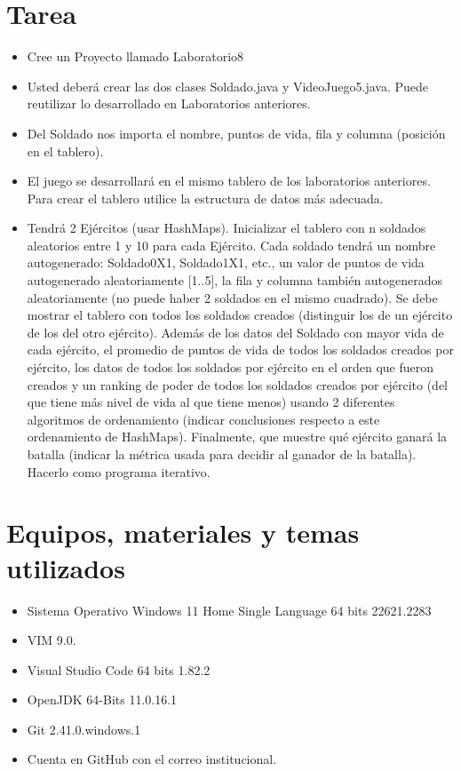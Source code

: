 \documentclass{article}
\begin{document}
	\section{Tarea}
	\begin{itemize}
		\subsection{Videojuego}
			\item Cree un Proyecto llamado Laboratorio8
			\item Usted deberá crear las dos clases Soldado.java y VideoJuego5.java. Puede reutilizar lo
desarrollado en Laboratorios anteriores.
			\item Del Soldado nos importa el nombre, puntos de vida, fila y columna (posición en el tablero).
			\item El juego se desarrollará en el mismo tablero de los laboratorios anteriores. Para crear el
tablero utilice la estructura de datos más adecuada.
			\item Tendrá 2 Ejércitos (usar HashMaps). Inicializar el tablero con n soldados aleatorios entre 1 y
10 para cada Ejército. Cada soldado tendrá un nombre autogenerado: Soldado0X1,
Soldado1X1, etc., un valor de puntos de vida autogenerado aleatoriamente [1..5], la fila y
columna también autogenerados aleatoriamente (no puede haber 2 soldados en el mismo
cuadrado). Se debe mostrar el tablero con todos los soldados creados (distinguir los de un
ejército de los del otro ejército). Además de los datos del Soldado con mayor vida de cada
ejército, el promedio de puntos de vida de todos los soldados creados por ejército, los datos
de todos los soldados por ejército en el orden que fueron creados y un ranking de poder de
todos los soldados creados por ejército (del que tiene más nivel de vida al que tiene menos)
usando 2 diferentes algoritmos de ordenamiento (indicar conclusiones respecto a este ordenamiento de HashMaps). Finalmente, que muestre qué ejército ganará la batalla (indicar
la métrica usada para decidir al ganador de la batalla). Hacerlo como programa iterativo.
	\end{itemize}
		
	\section{Equipos, materiales y temas utilizados}
	\begin{itemize}
		\item Sistema Operativo Windows 11 Home Single Language 64 bits 22621.2283
		\item VIM 9.0.
		\item Visual Studio Code 64 bits 1.82.2
		\item OpenJDK 64-Bits 11.0.16.1
		\item Git 2.41.0.windows.1
		\item Cuenta en GitHub con el correo institucional. 
	\end{itemize}
	
\end{document}

